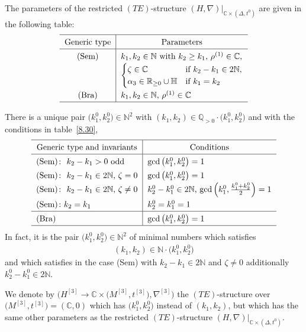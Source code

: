 \documentclass[pdftex]{sigma}%
\numberwithin{equation}{section}
\numberwithin{figure}{section}
\newcommand{\N}{{\mathbb N}}
\newcommand{\Q}{{\mathbb Q}}
\newcommand{\C}{{\mathbb C}}
\newcommand{\R}{{\mathbb R}}
\renewcommand{\H}{{\mathbb H}}
\newcommand{\nnn}{\nabla}
\begin{document}
The parameters of the restricted $(TE)$-structure
$(H,\nnn)|_{\C\times(\Delta,t^0)}$ are given in the
following table:
\[
\def\arraystretch{1.4}
\begin{tabular}{c|l}
\hline
\multicolumn{1}{c|}{Generic type} & \multicolumn{1}{c}{Parameters}
\\ \hline
(Sem)& $k_1,k_2\in\N$ with $k_2\geq k_1$, $\rho^{(1)}\in\C$,
\\
& $\begin{cases}
 \zeta\in\C & \text{if}\ k_2-k_1\in 2\N,\\
 \alpha_3\in \R_{\geq 0}\cup\H & \text{if}\ k_1=k_2
 \end{cases}$
 \\
(Bra) & $k_1,k_2\in\N$, $\rho^{(1)}\in\C$
\\
\hline
\end{tabular}
\]

There is a unique pair $\big(k_1^0,k_2^0\big)\in\N^2$ with
$(k_1,k_2)\in\Q_{>0}\cdot \big(k_1^0,k_2^0\big)$ and with
the conditions in table~\eqref{8.30},
\begin{gather}\label{8.30}
\def\arraystretch{1.4}
\begin{tabular}{l|l}
\hline
\multicolumn{1}{c|}{Generic type and invariants} & \multicolumn{1}{c}{Conditions}
\\ \hline
(Sem$)\colon\ k_2-k_1>0$ odd& $\gcd\big(k^0_1,k^0_2\big)=1$
\\
(Sem$)\colon\ k_2-k_1\in 2\N$, $\zeta= 0$ & $\gcd\big(k^0_1,k^0_2\big)=1$
\\
(Sem$)\colon\ k_2-k_1\in 2\N$, $\zeta\neq 0$ &$k^0_2-k^0_1\in 2\N$, $\gcd\left(k^0_1,\frac{k_1^0+k^0_2}{2}\right)=1$
\\
(Sem$)\colon k_2=k_1$ & $k^0_2=k^0_1=1$
\\
\hline
(Bra) & $\gcd\big(k^0_1,k^0_2\big)=1$
\\
\hline
\end{tabular}
\end{gather}
In fact, it is the pair $\big(k_1^0,k_2^0\big)\in\N^2$
of minimal numbers which satisfies{\samepage
\begin{gather*}%
(k_1,k_2)\in \N\cdot \big(k_1^0,k_2^0\big)
\end{gather*}
and which satisfies in the case (Sem) with $k_2-k_1\in 2\N$
and $\zeta\neq 0$ additionally $k_2^0-k_1^0\in 2\N$.}

We denote by $\big(H^{[3]}\to\C\times \big(M^{[3]},t^{[3]}\big),\nnn^{[3]}\big)$
the $(TE)$-structure over $\big(M^{[3]},t^{[3]}\big)=(\C,0)$
which has $\big(k_1^0,k_2^0\big)$ instead of $(k_1,k_2)$,
but which has the same other parameters as the restricted
$(TE)$-structure $(H,\nnn)|_{\C\times(\Delta,t^0)}$.
\end{document}
